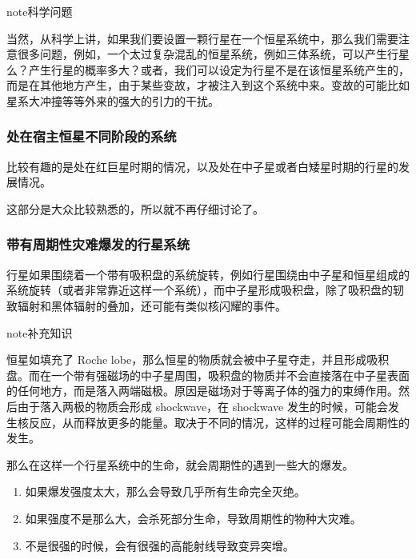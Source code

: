 \documentclass[letterpaper,10pt,english]{sphinxmanual}
\begin{document}
\begin{notice}{note}{科学问题}

当然，从科学上讲，如果我们要设置一颗行星在一个恒星系统中，那么我们需要注意很多问题，例如，一个太过复杂混乱的恒星系统，例如三体系统，可以产生行星么？产生行星的概率多大？或者，我们可以设定为行星不是在该恒星系统产生的，而是在其他地方产生，由于某些变故，才被注入到这个系统中来。变故的可能比如星系大冲撞等等外来的强大的引力的干扰。
\end{notice}


\subsubsection{处在宿主恒星不同阶段的系统}
\label{astro:id3}
比较有趣的是处在红巨星时期的情况，以及处在中子星或者白矮星时期的行星的发展情况。

这部分是大众比较熟悉的，所以就不再仔细讨论了。


\subsubsection{带有周期性灾难爆发的行星系统}
\label{astro:id4}
行星如果围绕着一个带有吸积盘的系统旋转，例如行星围绕由中子星和恒星组成的系统旋转（或者非常靠近这样一个系统），而中子星形成吸积盘，除了吸积盘的轫致辐射和黑体辐射的叠加，还可能有类似核闪耀的事件。

\begin{notice}{note}{补充知识}

恒星如填充了 Roche lobe，那么恒星的物质就会被中子星夺走，并且形成吸积盘。而在一个带有强磁场的中子星周围，吸积盘的物质并不会直接落在中子星表面的任何地方，而是落入两端磁极。原因是磁场对于等离子体的强力的束缚作用。然后由于落入两极的物质会形成 shockwave，在 shockwave 发生的时候，可能会发生核反应，从而释放更多的能量。取决于不同的情况，这样的过程可能会周期性的发生。
\end{notice}

那么在这样一个行星系统中的生命，就会周期性的遇到一些大的爆发。
\begin{enumerate}
\item {} 
如果爆发强度太大，那么会导致几乎所有生命完全灭绝。

\item {} 
如果强度不是那么大，会杀死部分生命，导致周期性的物种大灾难。

\item {} 
不是很强的时候，会有很强的高能射线导致变异突增。

\end{enumerate}
\end{document}
